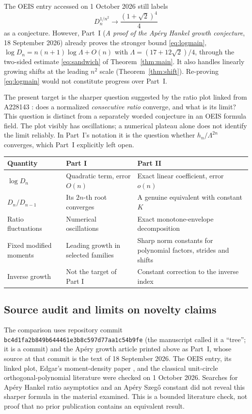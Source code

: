 \documentclass[11pt,a4paper]{article}
\numberwithin{equation}{section}
\theoremstyle{remark}\newtheorem{remark}[theorem]{Remark}
\newcommand{\Lam}{\Lambda}
\begin{document}
The OEIS entry accessed on 1 October 2026 still labels
\[
 D_n^{1/n^2}\longrightarrow\frac{(1+\sqrt2)^4}{4}
\]
as a conjecture. However, Part~I (\emph{A proof of the Ap\'ery Hankel growth
conjecture}, 18 September 2026) already proves the stronger bound
\eqref{eq:logmain}, $\log D_n=n(n+1)\log\Lam+O(n)$ with $\Lam=(17+12\sqrt2)/4$,
through the two-sided estimate \eqref{eq:sandwich} of Theorem~\ref{thm:main}.
It also handles linearly growing shifts at the leading $n^2$ scale
(Theorem~\ref{thm:shift}). Re-proving \eqref{eq:logmain} would not constitute
progress over Part~I.

The present target is the sharper question suggested by the ratio plot
linked from A228143 \cite{oeisplot}: does a normalized \emph{consecutive ratio}
converge, and what is its limit? This question is distinct from a separately
worded conjecture in an OEIS formula field. The plot visibly has oscillations;
a numerical plateau alone does not identify the limit reliably. In Part~I's
notation it is the question whether $h_n/\Lambda^{2n}$ converges, which
Part~I explicitly left open.

\begin{center}
\begin{tabular}{>{\raggedright\arraybackslash}p{}>{\raggedright\arraybackslash}p{}>{\raggedright\arraybackslash}p{}}
\toprule
Quantity & Part I & Part II\\
\midrule
$\log D_n$ & Quadratic term, error $O(n)$ & Exact linear coefficient, error $o(n)$\\[3pt]
$D_n/D_{n-1}$ & Its $2n$-th root converges & A genuine equivalent with constant $K$\\[3pt]
Ratio fluctuations & Numerical oscillations & Exact monotone-envelope decomposition\\[3pt]
Fixed modified moments & Leading growth in selected families & Sharp norm constants for polynomial factors, strides and shifts\\[3pt]
Inverse growth & Not the target of Part I & Constant correction to the inverse index\\
\bottomrule
\end{tabular}
\end{center}

\subsection{Source audit and limits on novelty claims}
The comparison uses repository commit
\texttt{bc4d1fa2b849b644461e3b8c597d77aa1c54b9fe} (the manuscript called it a
``tree''; it is a commit) and the Ap\'ery growth article printed above as
Part~I, whose source at that commit is the text of 18 September 2026.
The OEIS entry, its linked plot,
Edgar's moment-density paper \cite{edgar}, and the classical unit-circle
orthogonal-polynomial literature \cite{simon} were checked on
1 October 2026. Searches for Ap\'ery Hankel ratio asymptotics and an Ap\'ery
Szeg\H{o} constant did not reveal this sharper formula in the material
examined. This is a bounded literature check, not proof that no prior
publication contains an equivalent result.
\end{document}
